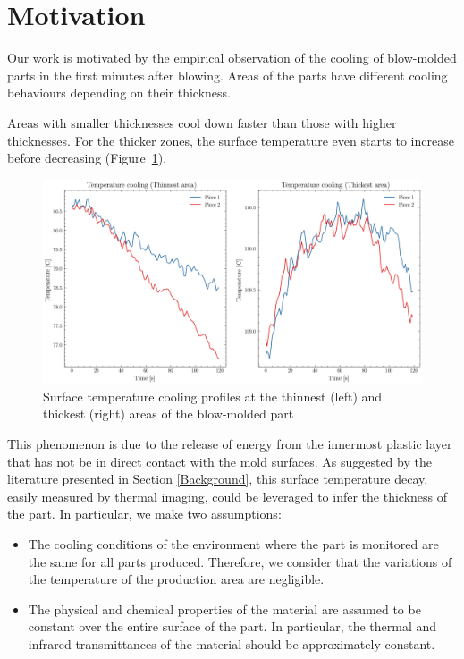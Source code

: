 \section{Motivation} \label{Motivation}

Our work is motivated by the empirical observation of the cooling of blow-molded parts in the first minutes after blowing. Areas of the parts have different cooling behaviours depending on their thickness. 

Areas with smaller thicknesses cool down faster than those with higher thicknesses. For the thicker zones, the surface temperature even starts to increase before decreasing (Figure~\ref{fig:temperature_cooling}).
%
\begin{figure}
\centering
\includegraphics[scale=0.55]{images/chapter_4/cooling.eps}
\caption{Surface temperature cooling profiles at the thinnest (left) and thickest (right) areas of the blow-molded part}
\label{fig:temperature_cooling}
\end{figure}
%
This phenomenon is due to the release of energy from the innermost plastic layer that has not be in direct contact with the mold surfaces.
As suggested by the literature presented in Section \ref{Background}, this surface temperature decay, easily measured by thermal imaging, could be leveraged to infer the thickness of the part.  
In particular, we make two assumptions:
\begin{itemize}
   \item The cooling conditions of the environment where the part is monitored are the same for all parts produced. Therefore, we consider that the variations of the temperature of the production area are negligible.
   \item The physical and chemical properties of the material are assumed to be constant over the entire surface of the part. In particular, the thermal and infrared transmittances of the material should be approximately constant.
\end{itemize}

